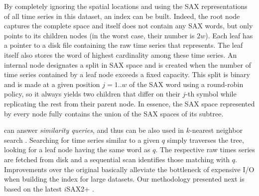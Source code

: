 By completely ignoring the spatial locations and using the SAX representations of all time series in this dataset, an \isax index \cite{shieh2008kdd} can be built. Indeed, the root node captures the complete \isax space and itself does not contain any SAX words, but only points to its children nodes (in the worst case, their number is $2w$). Each leaf has a pointer to a disk file containing the raw time series that represents. The leaf itself also stores the \isax word of highest cardinality among these time series. An internal node designates a split in SAX space and is created when the number of time series contained by a leaf node exceeds a fixed capacity. This split is binary and is made at a given position $j=1..w$ of the SAX word using a round-robin policy, so it always yields two children that differ on their $j$-th symbol while replicating the rest from their parent node. In essence, the SAX space represented by every node fully contains the union of the SAX spaces of its subtree.

\isax can answer {\em similarity queries}, and thus can be also used in $k$-nearest neighbor search \cite{shieh2008kdd}. Searching for time series similar to a given $q$ simply traverses the \isax tree, looking for a leaf node having the same \isax word as $q$. The respective raw times series are fetched from disk and a sequential scan identifies those matching with $q$. Improvements over the original \isax basically alleviate the bottleneck of expensive I/O when building the index for large datasets. Our methodology presented next is based on the latest $i$SAX2+ \cite{camerra2014kais}.




